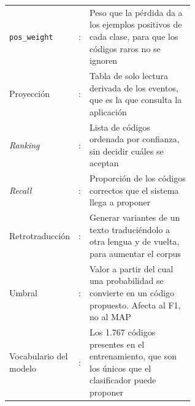 \begin{longtable}{l r p{0.6\linewidth}}
\texttt{pos\_weight} & : & Peso que la pérdida da a los ejemplos positivos de cada clase, para que los códigos raros no se ignoren \\
Proyección & : & Tabla de solo lectura derivada de los eventos, que es la que consulta la aplicación \\
\emph{Ranking} & : & Lista de códigos ordenada por confianza, sin decidir cuáles se aceptan \\
\emph{Recall} & : & Proporción de los códigos correctos que el sistema llega a proponer \\
Retrotraducción & : & Generar variantes de un texto traduciéndolo a otra lengua y de vuelta, para aumentar el corpus \\
Umbral & : & Valor a partir del cual una probabilidad se convierte en un código propuesto. Afecta al F1, no al MAP \\
Vocabulario del modelo & : & Los 1.767 códigos presentes en el entrenamiento, que son los únicos que el clasificador puede proponer \\
\end{longtable}


\idxGral
\idxFiguras
\idxTablas
\idxListados
\idxAlgoritmos
